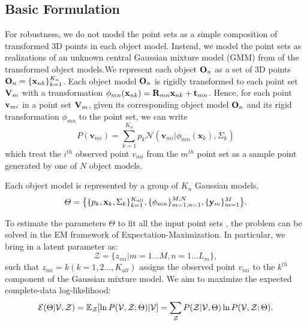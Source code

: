 \subsection{Basic Formulation}
For robustness, we do not model the point sets as a simple composition of transformed 3D points in each object model. Instead, we model the point sets as realizations of an unknown central Gaussian mixture model (GMM) from of the transformed object models.We represent each object $\mathbf{O}_{n}$ as a set of 3D points $\mathbf{O}_{n}=\{\mathbf{x}_{nk}\}^{K_n}_{k=1}$. Each object model $\mathbf{O}_{n}$ is rigidly transformed to each point set $\mathbf{V}_m$ with a transformation $\phi_{mn}(\mathbf{x}_{nk})=\mathbf{R}_{mn}\mathbf{x}_{nk}+\mathbf{t}_{mn}$.
%
Hence, for each point $\mathbf{v}_{mi}$ in a point set $\mathbf{V}_m$, given its corresponding object model $\mathbf{O}_{n}$ and its rigid transformation $\phi_{mn}$ to the point set, we can write
\begin{equation}
\label{equ:model}
P(\pmb{v}_{mi})=\sum^{K_n}_{k=1}p_k\mathcal{N}(\pmb{v}_{mi}|\phi_{mn}(\pmb{x}_k),\Sigma_k)
\end{equation}
which treat the $i^{th}$ observed point $v_{mi}$ from the $m^{th}$ point set as a sample point generated by one of $N$ object models.

Each object model is represented by a group of $K_n$ Gaussian models.
%
\begin{displaymath}
\varTheta=\big \{\{p_k,\mathbf{x}_k,\Sigma_k\}_{k=1}^{K_{all}},\{\phi_{mn}\}_{m=1,n=1}^{M,N}, \{\mathbf{y}_{m}\}^{M}_{m=1}\big\}.
\end{displaymath}
 

To estimate the parameters $\Theta$ to fit all the input point sets , the problem can be solved in the EM framework of Expectation-Maximization. 
%
In particular, we bring in a latent parameter as: 
\begin{equation}
\mathcal{Z}=\{z_{mi}|m=1...M,n=1...L_m\},
\end{equation}
%
such that $z_{mi}=k(k=1,2...,K_{all})$ assigns the observed point $v_{mi}$ to the $k^{th}$ component of the Gaussian mixture model. 
%
We aim to maximize the expected complete-data log-likelihood:
\begin{equation}
\label{equ:obj0}
\mathcal{E}(\Theta|\mathcal{V},\mathcal{Z})=\mathbb{E}_{\mathcal{Z}}[\ln P(\mathcal{V},\mathcal{Z};\Theta)|\mathcal{V}]={\sum_{\mathcal{Z}}P(\mathcal{Z}|\mathcal{V},\Theta)\ln{P(\mathcal{V},\mathcal{Z};\Theta)}}.
\end{equation}


